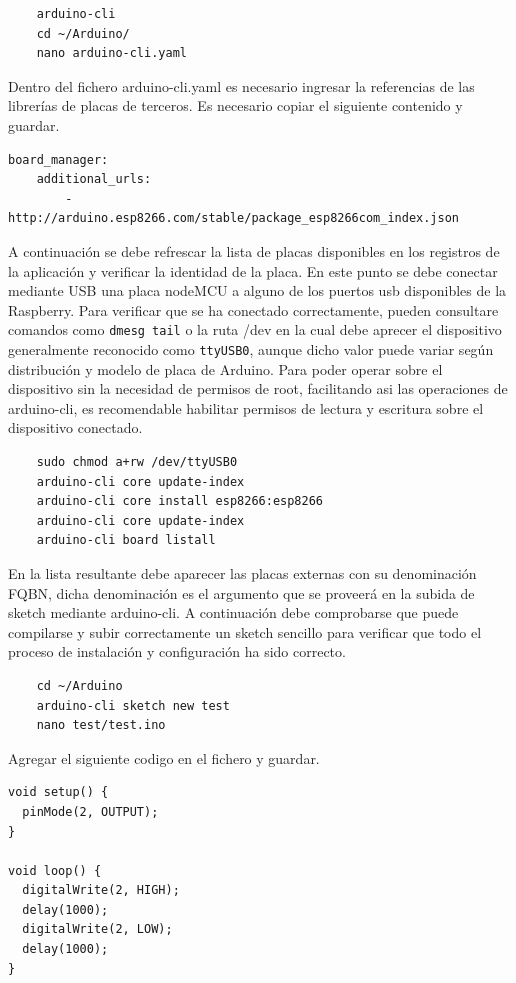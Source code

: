 \begin{verbatim}
    arduino-cli
    cd ~/Arduino/
    nano arduino-cli.yaml
\end{verbatim}

Dentro del fichero arduino-cli.yaml es necesario ingresar la referencias de las librerías de placas de terceros. Es necesario copiar el siguiente contenido y guardar.
    
\begin{verbatim}
board_manager:
    additional_urls:
        - http://arduino.esp8266.com/stable/package_esp8266com_index.json
\end{verbatim}
    
A continuación se debe refrescar la lista de placas disponibles en los registros de la aplicación y verificar la identidad de la placa. En este punto se debe conectar mediante USB una placa nodeMCU a alguno de los puertos \gls{usb} disponibles de la Raspberry. Para verificar que se ha conectado correctamente, pueden consultare comandos como \verb|dmesg tail| o la ruta /dev en la cual debe aprecer el dispositivo generalmente reconocido como \verb|ttyUSB0|, aunque dicho valor puede variar según distribución y modelo de placa de Arduino. Para poder operar sobre el dispositivo sin la necesidad de permisos de root, facilitando asi las operaciones de arduino-cli, es recomendable habilitar permisos de lectura y escritura sobre el dispositivo conectado.

\begin{verbatim}
    sudo chmod a+rw /dev/ttyUSB0
    arduino-cli core update-index
    arduino-cli core install esp8266:esp8266
    arduino-cli core update-index
    arduino-cli board listall
\end{verbatim}

En la lista resultante debe aparecer las placas externas con su denominación FQBN, dicha denominación es el argumento que se proveerá en la subida de \gls{sketch} mediante arduino-cli. A continuación debe comprobarse que puede compilarse y subir correctamente un  \gls{sketch} sencillo para verificar que todo el proceso de instalación y configuración ha sido correcto.

\begin{verbatim}
    cd ~/Arduino
    arduino-cli sketch new test
    nano test/test.ino
\end{verbatim}

Agregar el siguiente codigo en el fichero y guardar.
\begin{verbatim}
void setup() {
  pinMode(2, OUTPUT);
}

void loop() {
  digitalWrite(2, HIGH);
  delay(1000);
  digitalWrite(2, LOW);
  delay(1000);
}
\end{verbatim}

